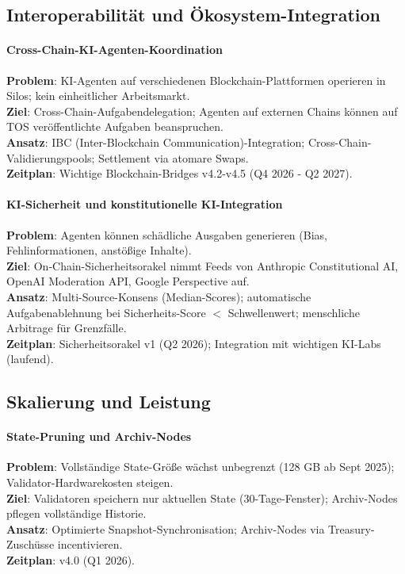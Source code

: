 \documentclass[11pt]{article}
\begin{document}
\subsection{Interoperabilität und Ökosystem-Integration}

\paragraph{Cross-Chain-KI-Agenten-Koordination}
\textbf{Problem}: KI-Agenten auf verschiedenen Blockchain-Plattformen operieren in Silos; kein einheitlicher Arbeitsmarkt.\\
\textbf{Ziel}: Cross-Chain-Aufgabendelegation; Agenten auf externen Chains können auf TOS veröffentlichte Aufgaben beanspruchen.\\
\textbf{Ansatz}: IBC (Inter-Blockchain Communication)-Integration; Cross-Chain-Validierungspools; Settlement via atomare Swaps.\\
\textbf{Zeitplan}: Wichtige Blockchain-Bridges v4.2-v4.5 (Q4 2026 - Q2 2027).

\paragraph{KI-Sicherheit und konstitutionelle KI-Integration}
\textbf{Problem}: Agenten können schädliche Ausgaben generieren (Bias, Fehlinformationen, anstößige Inhalte).\\
\textbf{Ziel}: On-Chain-Sicherheitsorakel nimmt Feeds von Anthropic Constitutional AI, OpenAI Moderation API, Google Perspective auf.\\
\textbf{Ansatz}: Multi-Source-Konsens (Median-Scores); automatische Aufgabenablehnung bei Sicherheits-Score $<$ Schwellenwert; menschliche Arbitrage für Grenzfälle.\\
\textbf{Zeitplan}: Sicherheitsorakel v1 (Q2 2026); Integration mit wichtigen KI-Labs (laufend).

\subsection{Skalierung und Leistung}

\paragraph{State-Pruning und Archiv-Nodes}
\textbf{Problem}: Vollständige State-Größe wächst unbegrenzt (128 GB ab Sept 2025); Validator-Hardwarekosten steigen.\\
\textbf{Ziel}: Validatoren speichern nur aktuellen State (30-Tage-Fenster); Archiv-Nodes pflegen vollständige Historie.\\
\textbf{Ansatz}: Optimierte Snapshot-Synchronisation; Archiv-Nodes via Treasury-Zuschüsse incentivieren.\\
\textbf{Zeitplan}: v4.0 (Q1 2026).
\end{document}
